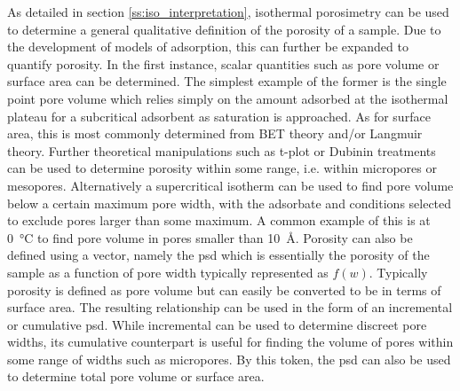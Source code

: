 As detailed in section \ref{ss:iso_interpretation}, isothermal porosimetry can be used to determine a general qualitative definition of the porosity of a sample. Due to the development of models of adsorption, this can further be expanded to quantify porosity. In the first instance, scalar quantities such as pore volume or surface area can be determined.\citep{Thommes2015Physisorption} The simplest example of the former is the single point pore volume which relies simply on the amount adsorbed at the isothermal plateau for a subcritical \gls{adsorbent} as saturation is approached. As for surface area, this is most commonly determined from BET theory and/or Langmuir theory.\citep{Brunauer1938Adsorption, Langmuir1918adsorption} Further theoretical manipulations such as t-plot or Dubinin treatments can be used to determine porosity within some range, i.e. within \glspl{micropore} or \glspl{mesopore}.\citep{Dubinin1971Description, Marczewski2002practical} Alternatively a supercritical isotherm can be used to find pore volume below a certain maximum pore width, with the adsorbate and conditions selected to exclude pores larger than some maximum. A common example of this is  at \qty{0}{\degreeCelsius} to find pore volume in pores smaller than \qty{10}{\angstrom}.\citep{Jagiello2019Enhanced, Sevilla2013Assessment, Thommes2015Physisorption} Porosity can also be defined using a vector, namely the \acrfull{psd} which is essentially the porosity of the sample as a function of pore width typically represented as $f(w)$. Typically porosity is defined as pore volume but can easily be converted to be in terms of surface area. The resulting relationship can be used in the form of an incremental or cumulative \acrshort{psd}. While incremental  can be used to determine discreet pore widths, its cumulative counterpart is useful for finding the volume of pores within some range of widths such as \glspl{micropore}. By this token, the \acrshort{psd} can also be used to determine total pore volume or surface area.\citep{Thommes2015Physisorption, shull1948physical, Barrett1951determination}

